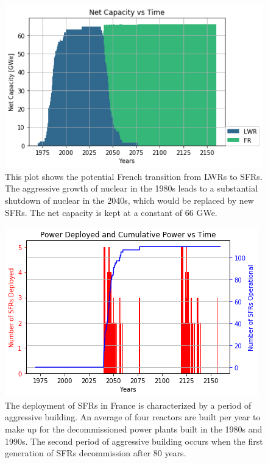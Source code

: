 \begin{figure}[htbp!]
        \begin{center}
                \includegraphics[scale=0.6]{./images/french-transition/power_plot.png}
        \end{center}
        \caption{This plot shows the potential French transition from \glspl{LWR} to \glspl{SFR}.
				 The aggressive growth of nuclear in the 1980s leads to a substantial shutdown
				 of nuclear in the 2040s, which would be replaced by new \glspl{SFR}. The net
				 capacity is kept at a constant of 66 GWe.}
        \label{fig:sfr_num}
\end{figure}
\begin{figure}[htbp!]
	\begin{center}
		\includegraphics[scale=0.6]{./images/french-transition/sfr_deploy.png}
	\end{center}
	\caption{The deployment of \glspl{SFR} in France is characterized by a period of
		     aggressive building. An average of four reactors are built per year to
		     make up for the decommissioned power plants built in the 1980s and 1990s.
		     The second period of aggressive building occurs when the first generation
		     of \glspl{SFR} decommission after 80 years.}
	\label{fig:dep}
\end{figure}
\FloatBarrier


